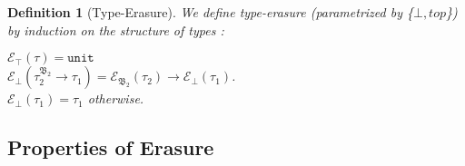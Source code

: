 \documentclass[a4paper,11pt,oneside]{article}
\theoremstyle{plain}
\newtheorem{definition}{Definition}[subsection]
\let\mf\mathfrak
\newcommand{\e}{\mathcal{E}}
\begin{document}
\begin{definition}[Type-Erasure] 
\label{type-erasure}
We define type-erasure  (parametrized by \{$\bot, top$\})  
by induction on the structure of types : \vspace{0.2cm} 

\noindent$ \e_{\top}(\tau) = \texttt{unit} $ \\
\noindent$ 
\e_{\bot}(\tau_{2}^{\mf{B_{2}}} \rightarrow \tau_{1})  
= \e_{\mf{B_{2}}}(\tau_{2}) \rightarrow \e_{\bot}(\tau_{1}) $. \\
\noindent$ \e_{\bot}(\tau_{1}) = \tau_{1}$ \qquad\qquad otherwise.\\

\end{definition}

\subsection{Properties of Erasure}







% 
% 
% 
\end{document}
